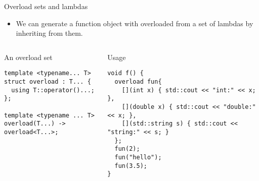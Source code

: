 \begin{frame}[t,fragile]{Overload sets and lambdas}
\begin{itemize}
  \item We can generate a function object with overloaded 
        from a set of lambdas by inheriting from them.
\end{itemize}

\begin{columns}[T]

\begin{block}{An overload set}
\begin{lstlisting}
template <typename... T>
struct overload : T... {
  using T::operator()...;
};

template <typename ... T>
overload(T...) -> overload<T...>;
\end{lstlisting}
\end{block}

\pause
{}
\begin{block}{Usage}
\begin{lstlisting}
void f() {
  overload fun{
    [](int x) { std::cout << "int:" << x; },
    [](double x) { std::cout << "double:" << x; },
    [](std::string s) { std::cout << "string:" << s; }
  };
  fun(2);
  fun("hello");
  fun(3.5);
}

\end{lstlisting}
\end{block}

\end{columns}
\end{frame}
